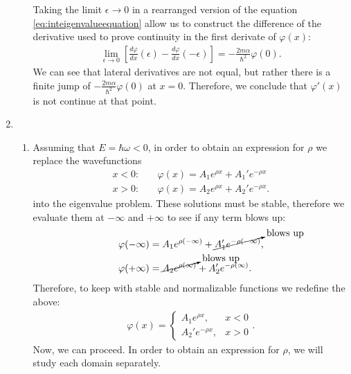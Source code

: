 \documentclass[letterpaper,11pt,twoside]{article}
\begin{document}
\begin{enumerate}[itemsep=0pt,topsep=0pt,label=(\alph*)]
\begin{enumerate}[itemsep=0pt,topsep=0pt,label=(a.\arabic*)]
    Taking the limit $\epsilon\to0$ in a rearranged version of the equation \eqref{eq:inteigenvalueequation} allow us to construct the difference of the 
    derivative used to prove continuity in the first derivate of $\varphi(x)$:
    \begin{align*}
      \lim_{\epsilon\to0}\left[\frac{d\varphi}{dx}(\epsilon)
        -\frac{d\varphi}{dx}(-\epsilon)\right]=-\frac{2m\alpha}{\hbar^2}\varphi(0).
    \end{align*}
    We can see that lateral derivatives are not equal, but rather there is a finite jump of $-\frac{2m\alpha}{\hbar^2}\varphi(0)$ at $x=0$. Therefore, we conclude that 
    $\varphi'(x)$ is not continue at that point.
  \end{enumerate}
  \item
    \begin{enumerate}[itemsep=0pt,topsep=0pt,label=(b.\arabic*)]
      \item Assuming that $E=\hbar\omega<0$, in order to obtain an expression for $\rho$ we replace the wavefunctions 
      \begin{align*}
        x<0:&\quad\varphi(x)=A_1e^{\rho x}+A_1'e^{-\rho x}\\
        x>0:&\quad\varphi(x)=A_2e^{\rho x}+A_2'e^{-\rho x}.
      \end{align*}
      into the eigenvalue problem. These solutions must be stable, therefore we evaluate them at $-\infty$ and $+\infty$ to see if any term blows up:
      \begin{align*}
        \varphi(-\infty)&=A_1e^{\rho(-\infty)}+\cancelto{\text{blows up}}{A_1'e^{-\rho(-\infty)}},\\
        \varphi(+\infty)&=\cancelto{\text{blows up}}{A_2e^{\rho(\infty)}}+A_2'e^{-\rho(\infty)}.
      \end{align*}
      Therefore, to keep with stable and normalizable functions we redefine the above:
      \begin{align*}
        \varphi(x)=\begin{cases}
          A_1e^{\rho x},&x<0\\
          A_2'e^{-\rho x},&x>0
        \end{cases}.
      \end{align*}
      Now, we can proceed. In order to obtain an expression for $\rho$, we will study each domain separately. 


\end{enumerate}
\end{enumerate}
\end{document}
